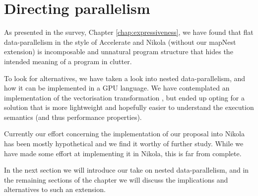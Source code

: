\chapter{Directing parallelism}
\label{chap:directing-parallelism}



As presented in the survey, Chapter \ref{chap:expressiveness}, we have
found that flat data-parallelism in the style of Accelerate and Nikola
(without our mapNest extension) is incomposable and unnatural program
structure that hides the intended meaning of a program in clutter.

To look for alternatives, we have taken a look into nested
data-parallelism, and how it can be implemented in a GPU language. We
have contemplated an implementation of the vectorisation
transformation , but ended up opting for a solution that is
more lightweight and hopefully easier to understand the execution
semantics (and thus performance properties).

Currently our effort concerning the implementation of our proposal
into Nikola has been mostly hypothetical and we find it worthy of
further study.  While we have made some effort at implementing it in
Nikola, this is far from complete.

In the next section we will introduce our take on nested
data-parallelism, and in the remaining sections of the chapter we will
discuss the implications and alternatives to such an extension.

